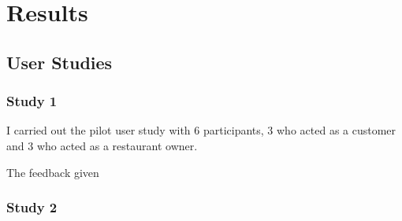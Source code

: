\chapter{Results}

\section{User Studies}

\subsection{Study 1}
\label{Study1Results}

I carried out the pilot user study with 6 participants, 3 who acted as a customer and 3 who acted as a restaurant owner. 

The feedback given 

\subsection{Study 2}
